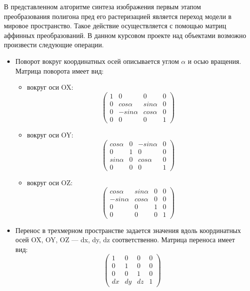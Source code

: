 В представленном алгоритме синтеза изображения первым этапом преобразования полигона пред его растеризацией является переход модели в мировое пространство. 
Такое действие осуществляется с помощью матриц аффинных преобразований.
В данном курсовом проекте над объектами возможно произвести следующие операции.

\begin{itemize}
	\item Поворот вокруг координатных осей описывается углом $\alpha$ и осью вращения.
	Матрица поворота имеет вид:
	\begin{itemize}
		\item вокруг оси OX:
		\begin{equation}
			\begin{pmatrix}
				1 	& 0 		  & 0 	       & 0 \\
				0 	& cos \alpha  & sin \alpha & 0 \\
				0	& -sin \alpha & cos \alpha & 0 \\
				0 	& 0 		  & 0          & 1
			\end{pmatrix}
		\end{equation}
		\item вокруг оси OY:
			\begin{equation}
			\begin{pmatrix}
				cos \alpha 	& 0 & -sin \alpha & 0 \\
				0 			& 1 & 0 		  & 0 \\
				sin \alpha	& 0 & cos \alpha  & 0 \\
				0 			& 0 & 0           & 1
			\end{pmatrix}
		\end{equation}
		\item вокруг оси OZ:
		\begin{equation}
			\begin{pmatrix}
				cos \alpha 	 & sin \alpha & 0 & 0 \\
				-sin \alpha  & cos \alpha & 0 & 0 \\
				0	 		 & 0		  & 1 & 0 \\
				0 			 & 0 		  & 0 & 1
			\end{pmatrix}
		\end{equation}
	\end{itemize}
	\item Перенос в трехмерном пространстве задается значения вдоль координатных осей OX, OY, OZ --- dx, dy, dz соответственно.
	Матрица переноса имеет вид:
	\begin{equation}
		\begin{pmatrix}
			1  & 0  & 0  & 0 \\
			0  & 1  & 0  & 0 \\
			0  & 0  & 1  & 0 \\
			dx & dy	& dz & 1
		\end{pmatrix}
	\end{equation}
\end{itemize}

